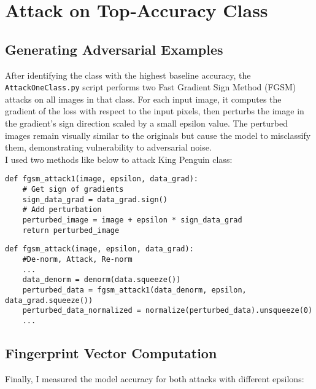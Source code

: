 \documentclass[a4paper,12pt]{report}
\begin{document}
\chapter{Attack on Top‑Accuracy Class}
\section{Generating Adversarial Examples}
After identifying the class with the highest baseline accuracy, the \texttt{AttackOneClass.py} script performs two Fast Gradient Sign Method (FGSM) attacks on all images in that class. For each input image, it computes the gradient of the loss with respect to the input pixels, then perturbs the image in the gradient’s sign direction scaled by a small epsilon value. The perturbed images remain visually similar to the originals but cause the model to misclassify them, demonstrating vulnerability to adversarial noise.\\

I used two methods like below to attack King Penguin class:
\begin{verbatim}
def fgsm_attack1(image, epsilon, data_grad):
    # Get sign of gradients
    sign_data_grad = data_grad.sign()
    # Add perturbation
    perturbed_image = image + epsilon * sign_data_grad
    return perturbed_image
\end{verbatim}
\hfill \break
\begin{verbatim}
def fgsm_attack(image, epsilon, data_grad):
    #De-norm, Attack, Re-norm
    ...
    data_denorm = denorm(data.squeeze())
    perturbed_data = fgsm_attack1(data_denorm, epsilon, data_grad.squeeze())
    perturbed_data_normalized = normalize(perturbed_data).unsqueeze(0)
    ...
\end{verbatim}

\section{Fingerprint Vector Computation}
Finally, I measured the model accuracy for both attacks with different epsilons:
\end{document}
